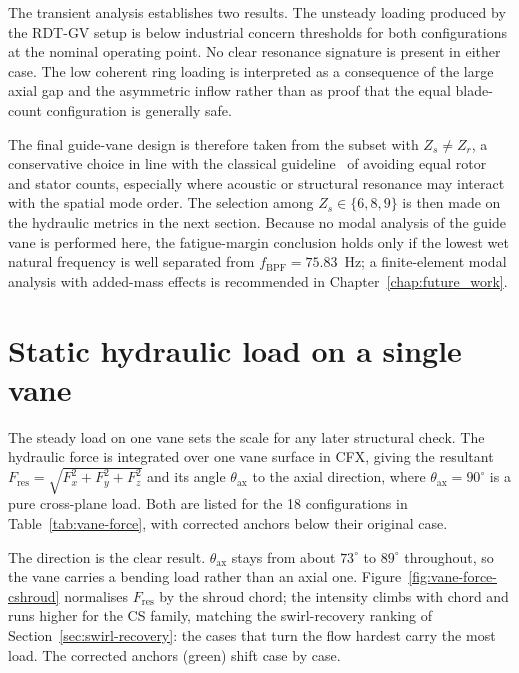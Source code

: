 The transient analysis establishes two results. The unsteady loading produced by the RDT-GV setup is below industrial concern thresholds for both configurations at the nominal operating point. No clear resonance signature is present in either case. The low coherent ring loading is interpreted as a consequence of the large axial gap and the asymmetric inflow rather than as proof that the equal blade-count configuration is generally safe.

The final guide-vane design is therefore taken from the subset with $Z_s \neq Z_r$, a conservative choice in line with the classical guideline~\cite{Brekke2001,Brekke2010,Tanaka2011,Binama2021FlowInstability} of avoiding equal rotor and stator counts, especially where acoustic or structural resonance may interact with the spatial mode order. The selection among $Z_s \in \{6, 8, 9\}$ is then made on the hydraulic metrics in the next section. Because no modal analysis of the guide vane is performed here, the fatigue-margin conclusion holds only if the lowest wet natural frequency is well separated from $f_{\mathrm{BPF}} = 75.83$~Hz; a finite-element modal analysis with added-mass effects is recommended in Chapter~\ref{chap:future_work}.

\section{Static hydraulic load on a single vane}
\label{sec:vane-load}

The steady load on one vane sets the scale for any later structural check. The hydraulic force is integrated over one vane surface in CFX, giving the resultant $F_{\mathrm{res}} = \sqrt{F_x^2 + F_y^2 + F_z^2}$ and its angle $\theta_{\mathrm{ax}}$ to the axial direction, where $\theta_{\mathrm{ax}} = 90^\circ$ is a pure cross-plane load. Both are listed for the 18 configurations in Table~\ref{tab:vane-force}, with corrected anchors below their original case.

The direction is the clear result. $\theta_{\mathrm{ax}}$ stays from about $73^\circ$ to $89^\circ$ throughout, so the vane carries a bending load rather than an axial one. Figure~\ref{fig:vane-force-cshroud} normalises $F_{\mathrm{res}}$ by the shroud chord; the intensity climbs with chord and runs higher for the CS family, matching the swirl-recovery ranking of Section~\ref{sec:swirl-recovery}: the cases that turn the flow hardest carry the most load. The corrected anchors (green) shift case by case.

